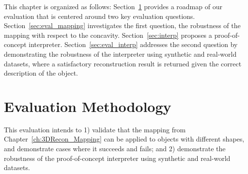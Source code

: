 
This chapter is organized as follows: Section~\ref{sec:interp_eval_methodology} provides a roadmap of our evaluation that is centered around two key evaluation questions. Section~\ref{sec:eval_mapping} investigates the first question, \ie the robustness of the mapping with respect to the concavity. Section~\ref{sec:interp} proposes a proof-of-concept interpreter. Section~\ref{sec:eval_interp} addresses the second question by  demonstrating the robustness of the interpreter using synthetic and real-world datasets, where a satisfactory reconstruction result is returned given the correct description of the object.


\section{Evaluation Methodology}
\label{sec:interp_eval_methodology}

This evaluation intends to 1) validate that the mapping from Chapter~\ref{ch:3DRecon_Mapping} can be applied to objects with different shapes, and demonstrate cases where it succeeds and fails; and 2) demonstrate the robustness of the proof-of-concept interpreter using synthetic and real-world datasets.

